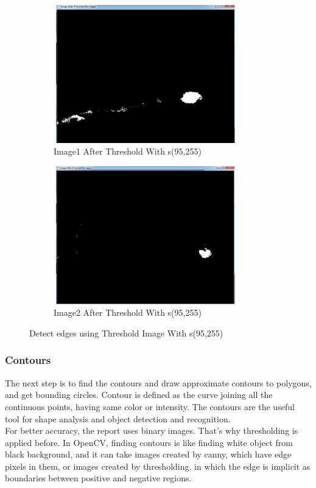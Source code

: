  \begin{figure}[!h]
\centering
\begin{subfigure}{.5\textwidth}
  \centering
  \includegraphics[width=8cm,height=6cm]{img/3}
  \caption{Image1 After Threshold With s(95,255)}
  \label{fig:sub1}
\end{subfigure}%
\begin{subfigure}{.5\textwidth}
  \centering
  \includegraphics[width=8cm,height=6cm]{img/1}
  \caption{Image2 After Threshold With s(95,255)}
  \label{fig:sub2}
\end{subfigure}
\caption{Detect edges using Threshold Image With s(95,255)}
\label{fig:test}
\end{figure}

\newpage
\subsubsection{Contours}
The next step is to find the contours and draw approximate contours to polygons, and get bounding circles. Contour is defined as the curve joining all the continuous points, having same color or intensity. The contours are the useful tool for shape analysis and object detection and recognition.\\

For better accuracy, the report uses binary images. That's why thresholding is applied before. In OpenCV, finding contours is like finding white object from black background, and it can take images created by canny, which have edge pixels in them, or images created by thresholding,  in which the edge is implicit as boundaries between positive and negative regions. \\

